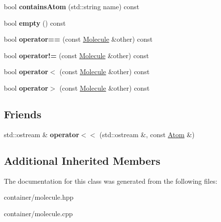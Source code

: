 \begin{DoxyCompactItemize}
\item 
\mbox{\label{classMolecule_a874d801249ed4ecc7546f966569fb46e}} 
bool {\bfseries contains\+Atom} (std\+::string name) const
\item 
\mbox{\label{classMolecule_a3ac4752cf4109ce203ce2915ca78070c}} 
bool {\bfseries empty} () const
\item 
\mbox{\label{classMolecule_afe579bbd0c5fbbc3c13e47dfbcc6365a}} 
bool {\bfseries operator==} (const \mbox{\hyperlink{classMolecule}{Molecule}} \&other) const
\item 
\mbox{\label{classMolecule_ad45ebe1227fb20d3b67b6eba04ff8e06}} 
bool {\bfseries operator!=} (const \mbox{\hyperlink{classMolecule}{Molecule}} \&other) const
\item 
\mbox{\label{classMolecule_a46103a552f2114e0f37b3ec325249da7}} 
bool {\bfseries operator$<$} (const \mbox{\hyperlink{classMolecule}{Molecule}} \&other) const
\item 
\mbox{\label{classMolecule_a428eb340f80dcae8d48ea26a3204b311}} 
bool {\bfseries operator$>$} (const \mbox{\hyperlink{classMolecule}{Molecule}} \&other) const
\end{DoxyCompactItemize}
\subsection*{Friends}
\begin{DoxyCompactItemize}
\item 
\mbox{\label{classMolecule_a0b4533cd3ad55d6afaba9d291ded714b}} 
std\+::ostream \& {\bfseries operator$<$$<$} (std\+::ostream \&, const \mbox{\hyperlink{structAtom}{Atom}} \&)
\end{DoxyCompactItemize}
\subsection*{Additional Inherited Members}


The documentation for this class was generated from the following files\+:\begin{DoxyCompactItemize}
\item 
container/molecule.\+hpp\item 
container/molecule.\+cpp\end{DoxyCompactItemize}
